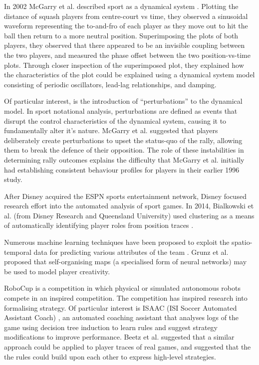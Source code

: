 In 2002 McGarry et al. described sport as a dynamical system
\cite{McGarry2002}. Plotting the distance of squash players from centre-court vs time, they observed a sinusoidal waveform representing the to-and-fro of each player as they move out to hit the ball then return to a more neutral position. Superimposing the plots of both players, they observed that there
appeared to be an invisible coupling between the two players, and
measured the phase offset between the two position-vs-time plots.
Through closer inspection of the superimposed plot, they explained how
the characteristics of the plot could be explained using a dynamical system
model consisting of periodic oscillators, lead-lag relationships, and
damping.

Of particular interest, is the introduction of ``perturbations'' to the
dynamical model. In sport notational analysis, perturbations are defined
as events that disrupt the control characteristics of the dynamical
system, causing it to fundamentally alter it's nature. McGarry et al. \cite{McGarry2002}
suggested that players deliberately create perturbations to upset the
status-quo of the rally, allowing them to break the defence of their
opposition. The role of these instabilities in determining rally
outcomes explains the difficulty that McGarry et al. initially had
establishing consistent behaviour profiles for players in their earlier
1996 \cite{McGarry1996} study.

After Disney acquired the ESPN sports entertainment network, Disney
focused research effort into the automated analysis of sport games. In
2014, Bialkowski et al. (from Disney Research and Queensland University)
used clustering as a means of automatically identifying player roles
from position traces \cite{Bialkowski2014}.

Numerous machine learning techniques have been proposed to exploit the
spatio-temporal data for predicting various attributes of the team
\cite{Hughes2004}. Grunz et al. \cite{Grunz2009} proposed that self-organising maps (a specialised form of neural
networks) may be used to model player creativity.

RoboCup is a competition in which physical or simulated autonomous
robots compete in an \soccer{} inspired competition. The competition has inspired
research into formalising strategy. Of particular interest is ISAAC (ISI
Soccer Automated Assistant Coach) \cite{Nair2004}, an automated coaching assistant that
analyses logs of the game using decision tree induction \cite{Quinlan1993} to learn rules and suggest strategy modifications to
improve performance. %
Beetz et al. \cite{Beetz2005} suggested that a similar approach could be
applied to player traces of real \soccer{} games, and suggested that the
the rules could build upon each other to express high-level strategies.

